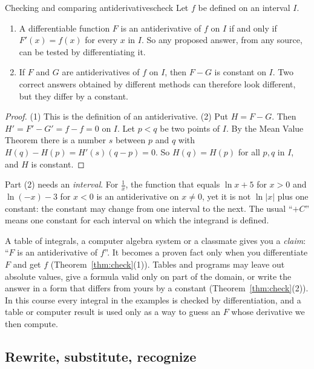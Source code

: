 \documentclass[11pt]{article}
\begin{document}
\begin{thm}{Checking and comparing antiderivatives}{check}
Let $f$ be defined on an interval $I$.
\begin{enumerate}[label=(\arabic*)]
  \item A differentiable function $F$ is an antiderivative of $f$ on $I$ if and only if $F'(x)=f(x)$ for every $x$ in $I$. So any proposed answer, from any source, can be tested by differentiating it.
  \item If $F$ and $G$ are antiderivatives of $f$ on $I$, then $F-G$ is constant on $I$. Two correct answers obtained by different methods can therefore look different, but they differ by a constant.
\end{enumerate}
\end{thm}
\begin{proof}
(1) This is the definition of an antiderivative. (2) Put $H=F-G$. Then $H'=F'-G'=f-f=0$ on $I$. Let $p<q$ be two points of $I$. By the Mean Value Theorem there is a number $s$ between $p$ and $q$ with $H(q)-H(p)=H'(s)(q-p)=0$. So $H(q)=H(p)$ for all $p,q$ in $I$, and $H$ is constant.
\end{proof}

Part (2) needs an \emph{interval}. For $\frac1x$, the function that equals $\ln x+5$ for $x>0$ and $\ln(-x)-3$ for $x<0$ is an antiderivative on $x\ne0$, yet it is not $\ln\lvert x\rvert$ plus one constant: the constant may change from one interval to the next. The usual ``$+C$'' means one constant for each interval on which the integrand is defined.

\begin{warn}
A table of integrals, a computer algebra system or a classmate gives you a \emph{claim}: ``$F$ is an antiderivative of $f$''. It becomes a proven fact only when you differentiate $F$ and get $f$ (Theorem~\ref{thm:check}(1)). Tables and programs may leave out absolute values, give a formula valid only on part of the domain, or write the answer in a form that differs from yours by a constant (Theorem~\ref{thm:check}(2)). In this course every integral in the examples is checked by differentiation, and a table or computer result is used only as a way to guess an $F$ whose derivative we then compute.
\end{warn}

\subsection*{Rewrite, substitute, recognize}
\end{document}
